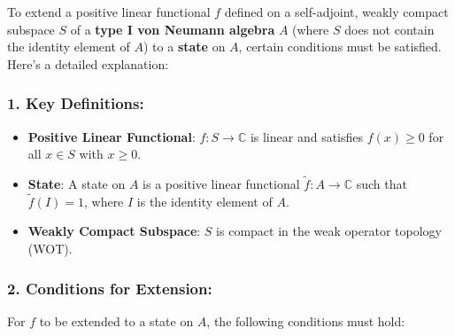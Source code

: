 \documentclass{article}
\begin{document}
To extend a positive linear functional $f $ defined on a self-adjoint,
weakly compact subspace $S $ of a \textbf{type I von Neumann algebra} $A $
(where $S $ does not contain the identity element of $A $) to a \textbf{state%
} on $A $, certain conditions must be satisfied. Here's a detailed
explanation:

\subsubsection*{1. \textbf{Key Definitions}:}

\begin{itemize}
\item \textbf{Positive Linear Functional}: $f: S \to \mathbb{C} $ is linear
and satisfies $f(x) \geq 0 $ for all $x \in S $ with $x \geq 0 $. 

\item \textbf{State}: A state on $A $ is a positive linear functional $%
\tilde{f}: A \to \mathbb{C} $ such that $\tilde{f}(I) = 1 $, where $I $ is
the identity element of $A $. 

\item \textbf{Weakly Compact Subspace}: $S $ is compact in the weak operator
topology (WOT).
\end{itemize}

\subsubsection*{2. \textbf{Conditions for Extension}:}

For $f $ to be extended to a state on $A $, the following conditions must
hold:
\end{document}
